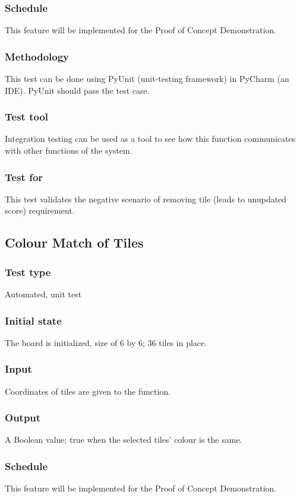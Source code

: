 \documentclass[12pt]{article}
\begin{document}
\subsubsection{Schedule}
This feature will be implemented for the Proof of Concept Demonstration.
\subsubsection{Methodology}
This test can be done using PyUnit (unit-testing framework) in PyCharm (an IDE). PyUnit should pass the test case.
\subsubsection{Test tool}
Integration testing can be used as a tool to see how this function communicates with other functions of the system.
\subsubsection{Test for}
This test validates the negative scenario of  removing tile (leads to unupdated score) requirement. 

\newpage

\subsection{Colour Match of Tiles}
\subsubsection{Test type}
Automated, unit test
\subsubsection{Initial state}
The board is initialized, size of 6 by 6; 36 tiles in place.
\subsubsection{Input}
Coordinates of tiles are given to the function.
\subsubsection{Output}
A Boolean value; true when the selected tiles' colour is the same.
\subsubsection{Schedule}
This feature will be implemented for the Proof of Concept Demonstration.
\end{document}
